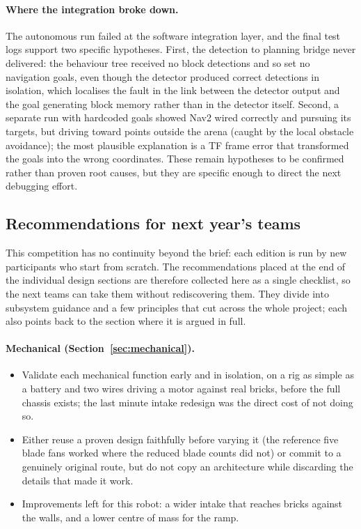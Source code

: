 \documentclass[11pt]{article}
\begin{document}
\paragraph{Where the integration broke down.} The autonomous run failed at the software integration layer, and the final test logs support two specific hypotheses. First, the detection to planning bridge never delivered: the behaviour tree received no block detections and so set no navigation goals, even though the detector produced correct detections in isolation, which localises the fault in the link between the detector output and the goal generating block memory rather than in the detector itself. Second, a separate run with hardcoded goals showed Nav2 wired correctly and pursuing its targets, but driving toward points outside the arena (caught by the local obstacle avoidance); the most plausible explanation is a TF frame error that transformed the goals into the wrong coordinates. These remain hypotheses to be confirmed rather than proven root causes, but they are specific enough to direct the next debugging effort.

\subsection{Recommendations for next year's teams}
This competition has no continuity beyond the brief: each edition is run by new participants who start from scratch. The recommendations placed at the end of the individual design sections are therefore collected here as a single checklist, so the next teams can take them without rediscovering them. They divide into subsystem guidance and a few principles that cut across the whole project; each also points back to the section where it is argued in full.

\paragraph{Mechanical (Section~\ref{sec:mechanical}).}
\begin{itemize}[noitemsep]
    \item Validate each mechanical function early and in isolation, on a rig as simple as a battery and two wires driving a motor against real bricks, before the full chassis exists; the last minute intake redesign was the direct cost of not doing so.
    \item Either reuse a proven design faithfully before varying it (the reference five blade fans worked where the reduced blade counts did not) or commit to a genuinely original route, but do not copy an architecture while discarding the details that made it work.
    \item Improvements left for this robot: a wider intake that reaches bricks against the walls, and a lower centre of mass for the ramp.
\end{itemize}
\end{document}
